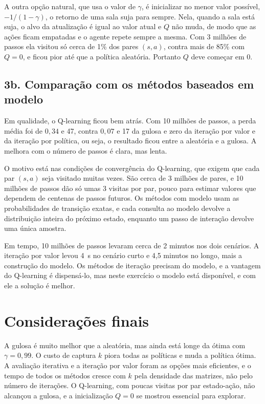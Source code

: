 \documentclass[11pt,a4paper]{article}
\begin{document}
A outra opção natural, que usa o valor de $\gamma$, é inicializar no menor valor possível, $-1/(1-\gamma)$, o retorno de uma sala suja para sempre. Nela, quando a sala está suja, o alvo da atualização é igual ao valor atual e $Q$ não muda, de modo que as ações ficam empatadas e o agente repete sempre a mesma. Com 3 milhões de passos ela visitou só cerca de 1\% dos pares $(s, a)$, contra mais de 85\% com $Q = 0$, e ficou pior até que a política aleatória. Portanto $Q$ deve começar em 0.

\subsection*{3b. Comparação com os métodos baseados em modelo}

Em qualidade, o Q-learning ficou bem atrás. Com 10 milhões de passos, a perda média foi de $0{,}34$ e 47, contra $0{,}07$ e 17 da gulosa e zero da iteração por valor e da iteração por política, ou seja, o resultado ficou entre a aleatória e a gulosa. A melhora com o número de passos é clara, mas lenta.

O motivo está nas condições de convergência do Q-learning, que exigem que cada par $(s, a)$ seja visitado muitas vezes. São cerca de 3 milhões de pares, e 10 milhões de passos dão só umas 3 visitas por par, pouco para estimar valores que dependem de centenas de passos futuros. Os métodos com modelo usam as probabilidades de transição exatas, e cada consulta ao modelo devolve a distribuição inteira do próximo estado, enquanto um passo de interação devolve uma única amostra.

Em tempo, 10 milhões de passos levaram cerca de 2 minutos nos dois cenários. A iteração por valor levou 4~s no cenário curto e 4,5 minutos no longo, mais a construção do modelo. Os métodos de iteração precisam do modelo, e a vantagem do Q-learning é dispensá-lo, mas neste exercício o modelo está disponível, e com ele a solução é melhor.

\section{Considerações finais}

A gulosa é muito melhor que a aleatória, mas ainda está longe da ótima com $\gamma = 0{,}99$. O custo de captura $k$ piora todas as políticas e muda a política ótima. A avaliação iterativa e a iteração por valor foram as opções mais eficientes, e o tempo de todos os métodos cresce com $k$ pela densidade das matrizes, não pelo número de iterações. O Q-learning, com poucas visitas por par estado-ação, não alcançou a gulosa, e a inicialização $Q = 0$ se mostrou essencial para explorar.
\end{document}
